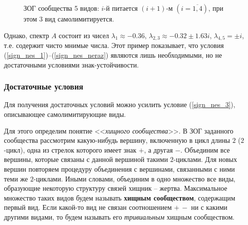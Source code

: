     \begin{figure}[H]
        \centering
        \caption{ЗОГ сообщества 5 видов: \(i\)-й питается \((i+1)\)-м \((i=\overline{1,4})\), при этом \(3\) вид самолимитируется.} \label{example_sign_unstable_zog}
    \end{figure}

    Однако, спектр \(A\) состоит из чисел \(\lambda_1 \approx -0.36\), \(\lambda_{2,3} \approx -0.32 \pm 1.63 i\), \(\lambda_{4,5} = \pm i\), т.е. содержит чисто мнимые числа. Этот пример показывает, что условия (\ref{sign_nes_1})--(\ref{sign_nes_neraz}) являются лишь необходимыми, но не достаточными условиями знак-устойчивости.


\subsubsection{Достаточные условия}
    Для получения достаточных условий можно усилить условие (\ref{sign_nes_3}), описывающее самолимитирующие виды.

    Для этого определим понятие <<\textit{хищного сообщества}>>. В ЗОГ заданного сообщества рассмотрим какую-нибудь вершину, включенную в цикл длины $2$ ($2$-цикл), одна из стрелок которого имеет знак \(+\), а другая \(-\). Объединим все вершины, которые связаны с данной вершиной такими \(2\)-циклами. Для новых вершин повторяем процедуру объединения с вершинами, связанными с ними теми же \(2\)-циклами. Иными словами, объединим в одно множество все виды, образующие некоторую структуру связей хищник -- жертва. Максимальное множество таких видов будем называть \textbf{хищным сообществом}, содержащим первый вид. Если какой-то вид не связан соотношением \(+ \, -\) ни с какими другими видами, то будем называть его \textit{тривиальным} хищным сообществом.


